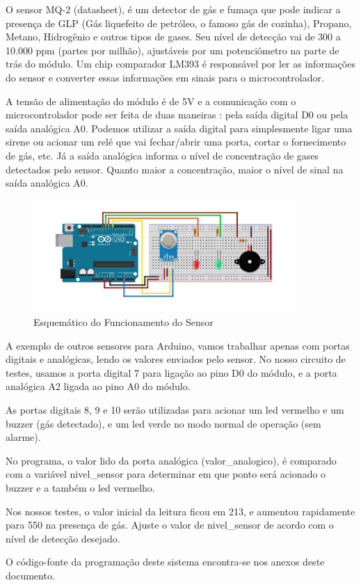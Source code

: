 \par O sensor MQ-2 (datasheet), é um detector de gás e fumaça que pode indicar a presença de GLP (Gás liquefeito de petróleo, o famoso gás de cozinha), Propano, Metano, Hidrogênio e outros tipos de gases. Seu nível de detecção vai de 300 a 10.000 ppm (partes por milhão), ajustáveis por um potenciômetro na parte de trás do módulo. Um chip comparador LM393 é responsável por ler as informações do sensor e converter essas informações em sinais para o microcontrolador.
\par A tensão de alimentação do módulo é de 5V e a comunicação com o microcontrolador pode ser feita de duas maneiras : pela saída digital D0 ou pela saída analógica A0. Podemos utilizar a saída digital para simplesmente ligar uma sirene ou acionar um relé que vai fechar/abrir uma porta, cortar o fornecimento de gás, etc. Já a saída analógica informa o nível de concentração de gases detectados pelo sensor. Quanto maior a concentração, maior o nível de sinal na saída analógica A0.

\begin{figure}[!h]
\caption{Esquemático do Funcionamento do Sensor}
\centering
\includegraphics[width=10cm]{figuras/funcionamento2}
\end{figure}

\par A exemplo de outros sensores para Arduino, vamos trabalhar apenas com portas digitais e analógicas, lendo os valores enviados pelo sensor. No nosso circuito de testes, usamos a porta digital 7 para ligação ao pino D0 do módulo, e a porta analógica A2 ligada ao pino A0 do módulo.
\par As portas digitais 8, 9 e 10 serão utilizadas para acionar um led vermelho e um buzzer (gás detectado), e um led verde no modo normal de operação (sem alarme).
\par No programa, o valor lido da porta analógica (valor\_analogico), é comparado com a variável nivel\_sensor para determinar em que ponto será acionado o buzzer e a também o led vermelho.
\par Nos nossos testes, o valor inicial da leitura ficou em 213, e aumentou rapidamente para 550 na presença de gás. Ajuste o valor de nivel\_sensor de acordo com o nível de detecção desejado.
\par O código-fonte da programação deste sistema encontra-se nos anexos deste documento.

